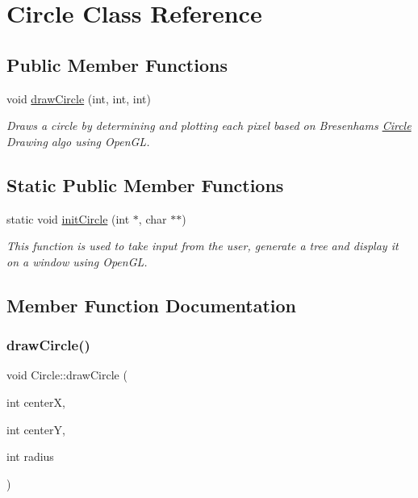 \hypertarget{class_circle}{}\section{Circle Class Reference}
\label{class_circle}
\subsection*{Public Member Functions}
\begin{DoxyCompactItemize}
\item 
void \mbox{\hyperlink{class_circle_aede1245d2b92f9d042878133274822cd}{draw\+Circle}} (int, int, int)
\begin{DoxyCompactList}\small\item\em Draws a circle by determining and plotting each pixel based on Bresenham\textquotesingle{}s \mbox{\hyperlink{class_circle}{Circle}} Drawing algo using Open\+GL. \end{DoxyCompactList}\end{DoxyCompactItemize}
\subsection*{Static Public Member Functions}
\begin{DoxyCompactItemize}
\item 
static void \mbox{\hyperlink{class_circle_afe00ea9113248e8f470cfbe5f227d986}{init\+Circle}} (int $\ast$, char $\ast$$\ast$)
\begin{DoxyCompactList}\small\item\em This function is used to take input from the user, generate a tree and display it on a window using Open\+GL. \end{DoxyCompactList}\end{DoxyCompactItemize}


\subsection{Member Function Documentation}
\mbox{\label{class_circle_aede1245d2b92f9d042878133274822cd}} 
\subsubsection{\texorpdfstring{draw\+Circle()}{drawCircle()}}
{\footnotesize\ttfamily void Circle\+::draw\+Circle (\begin{DoxyParamCaption}\item[{int}]{centerX,  }\item[{int}]{centerY,  }\item[{int}]{radius }\end{DoxyParamCaption})}



